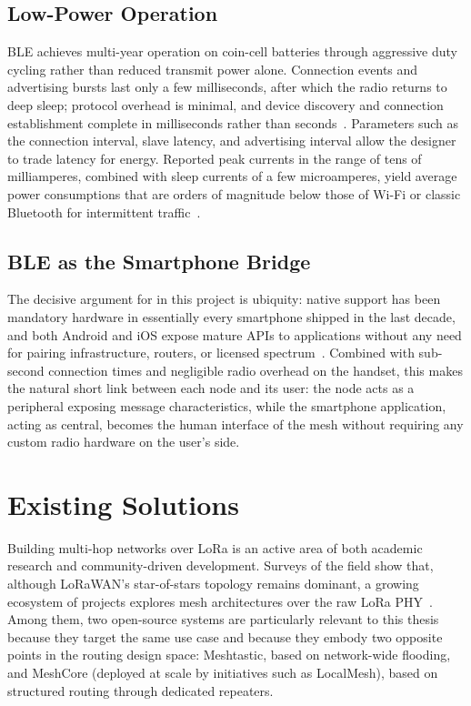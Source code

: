 \documentclass[english,bachelor]{tfgitic}[2026/01/22]
\begin{document}
\subsection{Low-Power Operation}

BLE achieves multi-year operation on coin-cell batteries through aggressive
duty cycling rather than reduced transmit power alone. Connection events and
advertising bursts last only a few milliseconds, after which the radio returns
to deep sleep; protocol overhead is minimal, and device discovery and
connection establishment complete in milliseconds rather than
seconds~\cite{gomez2012overview,tosi2017performance}. Parameters such as the
connection interval, slave latency, and advertising interval allow the designer
to trade latency for energy. Reported peak currents in the range of tens of
milliamperes, combined with sleep currents of a few microamperes, yield average
power consumptions that are orders of magnitude below those of Wi-Fi or classic
Bluetooth for intermittent traffic~\cite{siekkinen2012energy}.

\subsection{BLE as the Smartphone Bridge}

The decisive argument for  in this project is ubiquity: native  support has been mandatory hardware in essentially every smartphone shipped in the last decade, and both Android and iOS expose mature  APIs to applications without any need for pairing infrastructure, routers, or licensed spectrum~\cite{gomez2012overview}. Combined with sub-second connection times and negligible radio overhead on the handset, this makes  the natural short link between each node and its user: the node acts as a  peripheral exposing message characteristics, while the smartphone application, acting as central, becomes the human interface of the mesh without requiring any custom radio hardware on the user's side.

\section{Existing Solutions}
\label{sec:existing-solutions}

Building multi-hop networks over LoRa is an active area of both academic research and community-driven development. Surveys of the field show that, although LoRaWAN's star-of-stars topology remains dominant, a growing ecosystem of projects explores mesh architectures over the raw LoRa PHY~\cite{pueyo2021beyond,wong2024multihop}. Among them, two open-source systems are particularly relevant to this thesis because they target the same use case and because they embody two opposite points in the routing design space: Meshtastic, based on network-wide flooding, and MeshCore (deployed at scale by initiatives such as LocalMesh), based on structured routing through dedicated repeaters.
\end{document}
